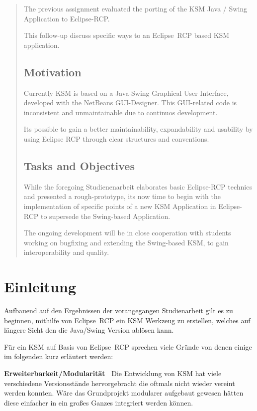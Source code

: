 \documentclass[%
12pt,titlepage,abstracton,DIV=10,BCOR=0.5cm]{scrreprt}
\begin{document}
\renewcommand{\abstractname}{Summary}
\begin{abstract}
The previous assignment evaluated the porting of the KSM Java / Swing
Application to Eclipse-RCP.

This follow-up discuss specific ways  to an Eclipse~RCP based KSM application.

\section*{Motivation} Currently KSM is based on a Java-Swing Graphical User
Interface, developed with the NetBeans GUI-Designer. This GUI-related code is
inconsistent and unmaintainable due to continuos development.

Its possible to gain a better maintainability, expandability and usability by
using Eclipse RCP through clear structures and conventions.

\section*{Tasks and Objectives}
While the foregoing Studienenarbeit elaborates
basic Eclipse-RCP technics and presented a rough-prototype, its now time to
begin with the implementation of specific points of a new KSM Application in
Eclipse-RCP to supersede the Swing-based Application.

The ongoing development will be in close cooperation with students working on
bugfixing and extending the Swing-based KSM, to gain interoperability and quality.
\end{abstract}

\tableofcontents
\newpage{}

\chapter{Einleitung}
Aufbauend auf den Ergebnissen der vorangegangen Studienarbeit gilt es zu
beginnen, mithilfe von Eclipse~RCP ein KSM Werkzeug zu erstellen, welches auf
längere Sicht den die Java/Swing Version ablösen kann.

Für ein KSM auf Basis von Eclipse~RCP sprechen viele Gründe von denen einige
im folgenden kurz erläutert werden:

\textbf{Erweiterbarkeit/Modularität\ } Die Entwicklung von KSM hat viele
verschiedene Versionsstände hervorgebracht die oftmals nicht wieder vereint
werden konnten. Wäre das Grundprojekt modularer aufgebaut gewesen hätten diese
einfacher in ein großes Ganzes integriert werden können.
\end{document}
